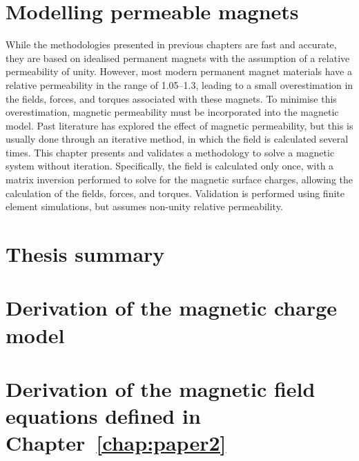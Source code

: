 \documentclass[11pt,a4paper,twoside]{book}
\begin{document}
\chapter{Modelling permeable magnets}\label{chap:paper4}
While the methodologies presented in previous chapters are fast and accurate, they are based on idealised permanent magnets with the assumption of a relative permeability of unity. However, most modern permanent magnet materials have a relative permeability in the range of 1.05--1.3, leading to a small overestimation in the fields, forces, and torques associated with these magnets. To minimise this overestimation, magnetic permeability must be incorporated into the magnetic model. Past literature has explored the effect of magnetic permeability, but this is usually done through an iterative method, in which the field is calculated several times. This chapter presents and validates a methodology to solve a magnetic system without iteration. Specifically, the field is calculated only once, with a matrix inversion performed to solve for the magnetic surface charges, allowing the calculation of the fields, forces, and torques. Validation is performed using finite element simulations, but assumes non-unity relative permeability.

\chapter{Thesis summary}\label{chap:conclusion}

\appendix
{}
\chapter{Derivation of the magnetic charge model}\label{app:chargeModelDerivation}

\chapter{Derivation of the magnetic field equations defined in Chapter~\ref{chap:paper2}}\label{app:fieldEquations}

\end{document}
